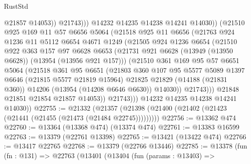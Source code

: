 \begin{lexlean}{RustStd}
\begin{coremodule}
                          @21857
                          @14053))
                      @21743)))
                @14232
                @14235
                @14238
                @14241
                @14030))
            (@21510
              @925
              @169
              @11
              @57
              @6656
              @5064
              (@21518
                @925
                @11
                @6656
                (@21763
                  @924
                  @1236
                  @11
                  @5112
                  @6654
                  @4671
                  @1249
                  (@21505
                    @924
                    @1236
                    @6654
                    (@21510
                      @922
                      @363
                      @157
                      @97
                      @6628
                      @6653
                      (@21731 @921 @6628 (@13949 (@13950 @6628)) (@13954 (@13956 @921 @157)))
                      (@21510
                        @361
                        @169
                        @95
                        @57
                        @6651
                        @5064
                        (@21518
                          @361
                          @95
                          @6651
                          (@21803
                            @360
                            @107
                            @95
                            @5577
                            @5089
                            @1397
                            @6646
                            (@21815 @5577 @21819 @15964)
                            @21825
                            @21829
                            (@14188 (@21831 @360))
                            @14206
                            (@13954 (@14208 @6646 @6630))
                            @14030))
                        @21743)))
                  @21848
                  @21851
                  @21854
                  @21857
                  @14053))
              @21743)))
        @14232
        @14235
        @14238
        @14241
        @14030))
@22755 := @21332
    (@21357 (@21398 (@21400 (@21402 (@21423 (@21441 (@21455 (@21473 (@21484 @22745)))))))))
@22756 := @13362 @474
@22760 := @13364 (@13368 @474) (@13374 @474)
@22761 := @13383 @16599
@22763 := @13379 (@22761 @13398)
@22765 := @13421 (@13422 @474)
@22766 := @13417 @22765
@22768 := @13379 (@22766 @13446)
@22785 := @13378
    (fun (fn : @131) =>
    @22763
      (@13401
        (@13404
          (fun (params : @13403) =>

\end{coremodule}
\end{lexlean}
